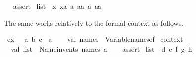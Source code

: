 \begin{isabellebody}
\ \ %
\isaantiq
assert{}%
\endisaantiq
\ {}list{}\ {}\ {}{}x{}{}\ {}xa{}{}\ {}a{}{}\ {}aa{}{}\ {}{}a{}{}\ {}{}aa{}{}{}{}\isanewline
{}%
\endisatagML
{\isafoldML}%
%
\isadelimML
%
\endisadelimML
%
\begin{isamarkuptext}%
\medskip The same works relatively to the formal context as
  follows.%
\end{isamarkuptext}%
\isamarkuptrue%
\isamarkupfalse%
\ ex\ {}\ \ a\ b\ c\ {}{}\ {}a\isanewline
{}\isanewline
%
\isadelimML
\isanewline
%
\endisadelimML
%
\isatagML
{}\isamarkupfalse%
\ {}\isanewline
\ \ val\ names\ {}\ Variable{}names{}of\ %
\isaantiq
context{}%
\endisaantiq
{}\isanewline
\isanewline
\ \ val\ list{}\ {}\ Name{}invents\ names\ {}a{}\ {}{}\isanewline
\ \ %
\isaantiq
assert{}%
\endisaantiq
\ {}list{}\ {}\ {}{}d{}{}\ {}e{}{}\ {}f{}{}\ {}g{}{}\ {}h{}{}{}{}\isanewline

\end{isabellebody}
